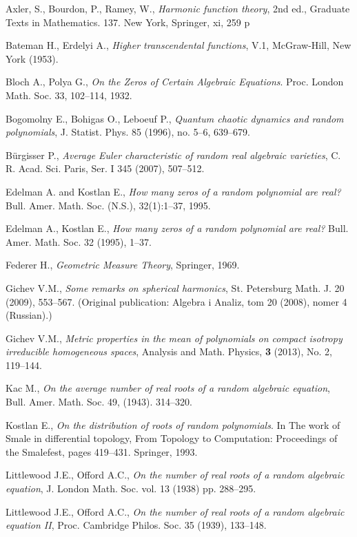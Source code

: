 \documentclass[10pt]{amsart}
\theoremstyle{remark}
\begin{document}
\begin{thebibliography}{9999}
 Axler, S., Bourdon, P., Ramey, W.,
{\it Harmonic function theory}, 2nd ed.,
Graduate Texts in Mathematics. 137.
New York, Springer, xi, 259 p

 Bateman H., Erdelyi A.,
{\it Higher transcendental functions}, V.1,
McGraw-Hill, New York (1953).

Bloch A., Polya G., {\it On the Zeros of Certain Algebraic
Equations}. Proc. London Math. Soc. 33, 102--114, 1932.

Bogomolny E., Bohigas O., Leboeuf P., {\it  Quantum chaotic
dynamics and random polynomials}, J. Statist. Phys. 85 (1996), no.
5--6, 639--679.

B\"urgisser P., {\it Average Euler characteristic of random real
algebraic varieties}, C. R. Acad. Sci. Paris, Ser. I 345 (2007),
507--512.

 Edelman A. and Kostlan E.,
{\it  How many zeros of a random polynomial are real?}
Bull. Amer. Math. Soc. (N.S.), 32(1):1--37, 1995.

Edelman A., Kostlan E., {\it How many zeros of a random polynomial
are real?}  Bull. Amer. Math. Soc. 32 (1995), 1--37.

Federer H., {\it Geometric Measure Theory}, Springer, 1969.

Gichev V.M., {\it Some remarks on spherical harmonics}, St.
Petersburg Math. J. 20 (2009), 553--567. (Original publication:
Algebra i Analiz, tom 20 (2008), nomer 4 (Russian).)

Gichev V.M., {\it Metric properties in the mean of polynomials on
compact isotropy irreducible homogeneous spaces}, Analysis and
Math. Physics,  {\bf 3} (2013), No. 2, 119--144.

Kac M., {\it  On the average number of real roots of a random
algebraic equation}, Bull. Amer. Math. Soc. 49, (1943). 314--320.

Kostlan E., {\it  On the distribution of roots of random
polynomials}. In The work of Smale in differential topology, From
Topology to Computation: Proceedings of the Smalefest, pages
419--431. Springer, 1993.

Littlewood J.E.,  Offord A.C., {\it On the number of real roots of
a random algebraic equation}, J. London Math. Soc. vol. 13 (1938)
pp. 288--295.

Littlewood J.E.,  Offord A.C., {\it On the number of real roots of
a random algebraic equation II}, Proc. Cambridge Philos. Soc. 35
(1939), 133--148.


\end{thebibliography}
\end{document}
